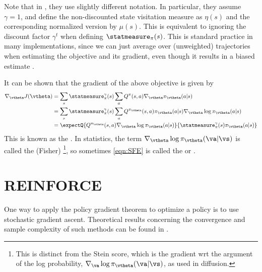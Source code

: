 Note that in 
\citep[Sec 13.2]{Suttonv2}, they use slightly different notation.
In particular, they assume $\gamma=1$,
and define the non-discounted state visitation measure
as $\eta(s)$ and the corresponding normalized version by $\mu(s)$.
This is equivalent to ignoring  the discount factor $\gamma^t$
when defining $\statmeasure_{\pi}(s)$.
This is standard practice in many implementations,
since we can just average over (unweighted)
trajectories when estimating
the objective and its gradient,
even though it
results in a biased estimate
\citep{Nota2020,Che2023}.

It can be shown that the gradient of the above objective is
given by
\begin{align}
\nabla_{\vtheta} J(\vtheta)
&=\sum_s \statmeasure_{\pi}^{\gamma}(s)
\sum_a Q^{\pi}(s,a) \nabla_{\vtheta} \pi_{\vtheta}(a|s)
\label{eqn:PGthm}
\\
&=\sum_s \statmeasure_{\pi}^{\gamma}(s)
\sum_a Q^{\pi_{\vtheta}}(s,a) \pi_{\vtheta}(a|s) \nabla_{\vtheta} \log \pi_{\vtheta}(a|s) \\
&=\expectQ
{Q^{\pi_{\vtheta}}(s,a) \nabla_{\vtheta} \log \pi_{\vtheta}(a|s)}
    {\statmeasure_{\pi}^{\gamma}(s) \pi_{\vtheta}(a|s)} 
\label{eqn:SFE}
\end{align}
This is known as the 
\citep{Sutton99b}.
In statistics, the term $\nabla_{\vtheta} \log \pi_{\vtheta}(\va|\vs)$
is called the (Fisher) \footnote{
%
This is distinct from the Stein score,
which is the gradient wrt the argument of the log probability,
$\nabla_{\va} \log \pi_{\vtheta}(\va|\vs)$,
as used in diffusion.
},
so sometimes \cref{eqn:SFE}
is called the 
or  \citep{Fu2015,Mohamed2020}.



\section{REINFORCE}
\label{sec:REINFORCE}
\label{sec:reinforceOpt}
\label{sec:reinforce}



One way to apply the policy gradient theorem
to optimize a policy is to use stochastic gradient ascent.
Theoretical results concerning the convergence
and sample complexity of such
methods can be found in \citep{Agarwal2021}.

